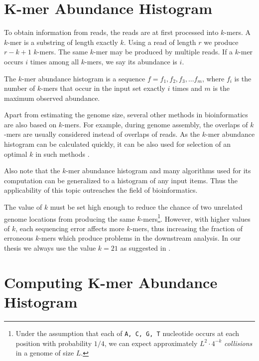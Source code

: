 \section{K-mer Abundance Histogram}
\label{sec:histogram}
To obtain information from reads, the reads are at first processed into $k$-mers. 
A $k$-mer is a substring of length exactly $k$. Using a read of length $r$ we produce 
$r-k+1$ $k$-mers. The same $k$-mer may be produced by multiple reads. If a $k$-mer occurs $i$ times
among all $k$-mers, we say its abundance is $i$. 

\begin{definition}
The $k$-mer abundance histogram is a sequence $f = f_1, f_2, f_3, \dots f_m$, 
where $f_i$ is the number of $k$-mers that occur in the input set exactly $i$ times 
and $m$ is the maximum observed abundance.
\end{definition}

Apart from estimating the genome size, several other methods in bioinformatics are also 
based on $k$-mers. For example, during genome assembly, the overlaps of $k$-mers are usually
considered instead of overlaps of reads. As the $k$-mer abundance histogram can be calculated
quickly, it can be also used for selection of an optimal $k$ in such methods \cite{Chikhi2013}.

Also note that the $k$-mer abundance histogram and many algorithms used for its computation
can be generalized to a histogram of any input items. Thus the applicability of this topic
outreaches the field of bioinformatics. 

\medskip

The value of $k$ must be set high enough to reduce the chance of two unrelated genome locations from 
producing the same $k$-mers\footnote{Under the assumption that each of \texttt{A, C, G, T}
nucleotide occurs at each position with probability $1/4$, we can expect approximately
$L^2 \cdot 4^{-k}$ \textit{collisions} in a genome of size $L$.}. However, with higher values of $k$,
each sequencing error affects more $k$-mers, thus increasing the fraction of erroneous $k$-mers
which produce problems in the downstream analysis. In our thesis we always use
the value $k=21$ as suggested in \cite{Williams2013, Hozza2015}.

\section{Computing K-mer Abundance Histogram}
\label{sec:algorithms}

